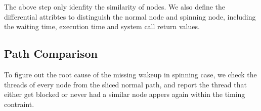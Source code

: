 The above step only idenfity the similarity of nodes.
We also define the differential attribtes to distinguish the normal node and spinning node,
including the waiting time, execution time and system call return values.

\subsection{Path Comparison}
To figure out the root cause of the missing wakeup in spinning case,
we check the threads of every node from the sliced normal path,
and report the thread that either get blocked or never had a similar node appers again
within the timing contraint.

